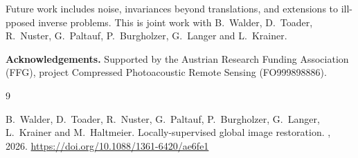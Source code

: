 \documentclass[11pt]{article}
\begin{document}
Future work includes noise, invariances beyond translations, and extensions  to ill-pposed inverse problems. 
This is joint work with B.~Walder, D.~Toader, R.~Nuster, G.~Paltauf,
P.~Burgholzer, G.~Langer and L.~Krainer.

\vspace{1em}

\noindent
\textbf{Acknowledgements.}
Supported by the Austrian Research Funding Association (FFG), project Compressed
Photoacoustic Remote Sensing (FO999898886).

\vspace{1em}

\begin{thebibliography}{9}

B.~Walder, D.~Toader, R.~Nuster, G.~Paltauf, P.~Burgholzer, G.~Langer,
L.~Krainer and M.~Haltmeier.
\newblock Locally-supervised global image restoration.
, 2026.
\newblock \url{https://doi.org/10.1088/1361-6420/ae6fe1}

\end{thebibliography}
\end{document}
